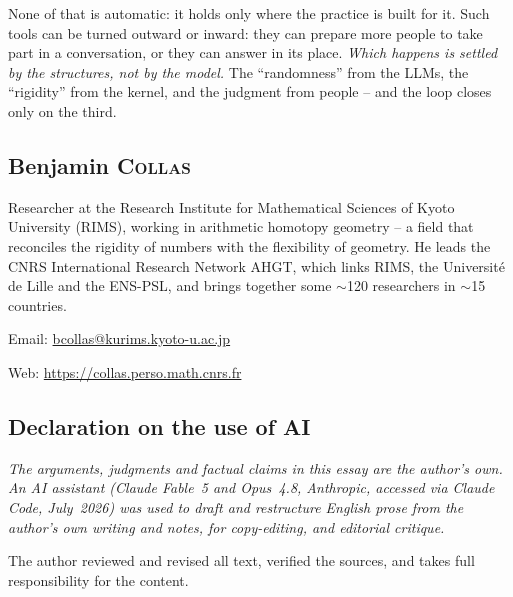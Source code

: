 \documentclass[11pt, a4paper,twosided]{amsart}
\begin{document}
None of that is automatic: it holds only where the practice is built for it. Such tools can be turned outward or inward: they can prepare more people to take part in a conversation, or they can answer in its place. \emph{Which happens is settled by the structures, not by the model.} The ``randomness'' from the LLMs, the ``rigidity'' from the kernel, and the judgment from people -- and the loop closes only on the third.

\begin{minipage}[t]{.45\linewidth}
  \vspace{0pt}
  \subsection*{Benjamin \textsc{Collas}}
  
  \medskip

  \small 
  Researcher at the Research Institute for Mathematical Sciences of Kyoto University (RIMS), working in arithmetic homotopy geometry -- a field that reconciles the rigidity of numbers with the flexibility of geometry. He leads the CNRS International Research Network \textsc{AHGT}, which links RIMS, the Universit\'e de Lille and the ENS-PSL, and brings together some $\sim$120 researchers in $\sim$15 countries.
  
  \medskip

  Email: \url{bcollas@kurims.kyoto-u.ac.jp}

  Web: \url{https://collas.perso.math.cnrs.fr}
\end{minipage}
\hfill
\begin{minipage}[t]{.45\linewidth}
  \vspace{0pt}
  \subsection*{Declaration on the use of AI}

  {\medskip \itshape
  The arguments, judgments and factual claims in this essay are the author's own. An AI assistant (Claude Fable~5 and Opus~4.8, Anthropic, accessed via Claude Code, July~2026) was used to draft and restructure English prose from the author's own writing and notes, for copy-editing, and editorial critique. 
  
  The author reviewed and revised all text, verified the sources, and takes full responsibility for the content.
  }  
\end{minipage}

{
	\printendnotes
	}
\end{document}
